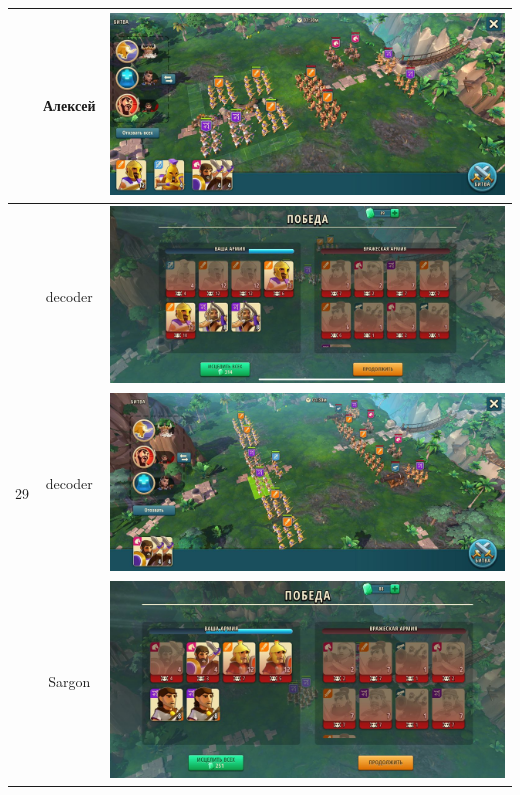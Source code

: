 \begin{longtable}{|c|c|c|}
    & Алексей &
    \includegraphics[width=0.75\linewidth]{./parts/media/TreasureHunt/26/alexey/photo_2022-04-07_10-09-28.jpg} \\
    \hline
    \multirow{6}{*}{29} & decoder &
    \includegraphics[width=0.75\linewidth]{./parts/media/TreasureHunt/29/decoder/photo_2022-04-07_09-59-23.jpg} \\
    & decoder &
    \includegraphics[width=0.75\linewidth]{./parts/media/TreasureHunt/29/decoder/photo_2022-04-07_09-59-10.jpg} \\
    \hline
    \multirow{6}{*}{29} & Sargon &
    \includegraphics[width=0.75\linewidth]{./parts/media/TreasureHunt/29/sargon/photo_2022-04-07_10-03-11.jpg} \\

\end{longtable}
